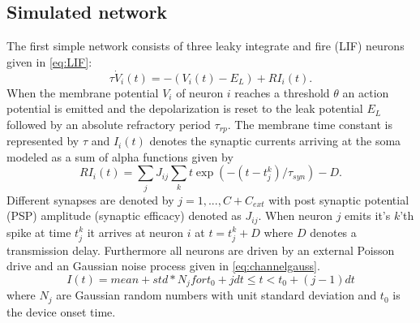 \documentclass[11pt]{article}
\begin{document}
\subsection{Simulated network}
The first simple network consists of three leaky integrate and fire (LIF) neurons given in \cref{eq:LIF}:
\begin{equation}
	\tau \dot{V}_{i}(t) = -(V_{i}(t) - E_{L}) + RI_{i}(t).
    \label{eq:LIF}
\end{equation}
When the membrane potential $ V_{i} $ of neuron $ i $ reaches a threshold $ \theta $ an action potential is emitted and the depolarization is reset to the leak potential $ E_{L} $ followed by an absolute refractory period $ \tau_{rp} $. The membrane time constant is represented by $ \tau $ and $ I_{i}(t) $ denotes the synaptic currents arriving at the soma modeled as a sum of alpha functions given by
\begin{equation}
	\label{eq:syn}
	RI_{i}(t) = \sum_{j}J_{ij}\sum_{k}t\exp(-(t-t_{j}^{k})/\tau_{syn}) - D.
\end{equation}
Different synapses are denoted by $ j = 1,...,C+C_{ext} $ with post synaptic potential (PSP) amplitude (synaptic efficacy) denoted as $ J_{ij} $. When neuron $ j $ emits it's $ k $'th spike at time $ t_{j}^k $ it arrives at neuron $ i $ at $ t = t_{j}^k + D $ where $ D $ denotes a transmission delay. Furthermore all neurons are driven by an external Poisson drive and an Gaussian noise process given in \cref{eq:channelgauss}.
\begin{equation}
	I(t) = mean + std * N_j for t_0 + j dt \leq t < t_0 + (j-1) dt 
    \label{eq:channelgauss}
\end{equation}
where $N_j$ are Gaussian random numbers with unit standard deviation and $t_0$ is 
the device onset time.


\pagestyle{empty}

{\footnotesize\linespread{1}
}
\newpage
\listoftodos
\end{document}
